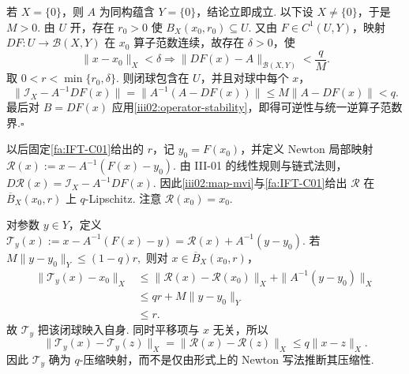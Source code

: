 \begin{FAProof}
若 \(\displaystyle X=\{0\}\)，则 \(\displaystyle A\) 为同构蕴含 \(\displaystyle Y=\{0\}\)，结论立即成立. 以下设 \(\displaystyle X\neq\{0\}\)，于是 \(\displaystyle M>0\). 由 \(\displaystyle U\) 开，存在 \(\displaystyle r_0>0\) 使 \(\displaystyle B_X(x_0,r_0)\subseteq U\). 又由 \(\displaystyle F\in C^1(U,Y)\)，映射 \(\displaystyle DF:U\to\mathcal B(X,Y)\) 在 \(\displaystyle x_0\) 算子范数连续，故存在 \(\displaystyle\delta>0\)，使
\[
\|x-x_0\|_X<\delta
\Longrightarrow
\|DF(x)-A\|_{\mathcal B(X,Y)}
<
\frac{q}{M}.
\]
取 \(\displaystyle0<r<\min\{r_0,\delta\}\). 则闭球包含在 \(\displaystyle U\)，并且对球中每个 \(\displaystyle x\)，
\[
\|\mathcal I_X-A^{-1}DF(x)\| = \|A^{-1}(A-DF(x))\| \leqslant M\|A-DF(x)\| <q.
\]
最后对 \(\displaystyle B=DF(x)\) 应用\autoref{iii02:operator-stability}，即得可逆性与统一逆算子范数界.\hfill\(\square\)

\end{FAProof}

以后固定\autoref{fa:IFT-C01}给出的 \(\displaystyle r\)，记 \(\displaystyle y_0=F(x_0)\)，并定义 Newton 局部映射
\(\displaystyle \mathcal R(x) := x-A^{-1}(F(x)-y_0).\)
由 III-01 的线性规则与链式法则，
\(\displaystyle D\mathcal R(x) = \mathcal I_X-A^{-1}DF(x).\)
因此\autoref{iii02:map-mvi}与\autoref{fa:IFT-C01}给出 \(\displaystyle\mathcal R\) 在 \(\displaystyle\overline B_X(x_0,r)\) 上 \(\displaystyle q\)-Lipschitz. 注意 \(\displaystyle\mathcal R(x_0)=x_0\).

对参数 \(\displaystyle y\in Y\)，定义
\(\displaystyle \mathcal T_y(x) := x-A^{-1}(F(x)-y) = \mathcal R(x)+A^{-1}(y-y_0).\)
若
\(\displaystyle M\|y-y_0\|_Y \leqslant (1-q)r,\)
则对 \(\displaystyle x\in\overline B_X(x_0,r)\)，
\[
\begin{aligned}
\|\mathcal T_y(x)-x_0\|_X
&\leqslant
\|\mathcal R(x)-\mathcal R(x_0)\|_X
+
\|A^{-1}(y-y_0)\|_X\\
&\leqslant
qr+M\|y-y_0\|_Y\\
&\leqslant
r.
\end{aligned}
\]
故 \(\displaystyle\mathcal T_y\) 把该闭球映入自身. 同时平移项与 \(\displaystyle x\) 无关，所以
\[
\|\mathcal T_y(x)-\mathcal T_y(z)\|_X
=
\|\mathcal R(x)-\mathcal R(z)\|_X
\leqslant
q\|x-z\|_X.
\]
因此 \(\displaystyle\mathcal T_y\) 确为 \(\displaystyle q\)-压缩映射，而不是仅由形式上的 Newton 写法推断其压缩性.

